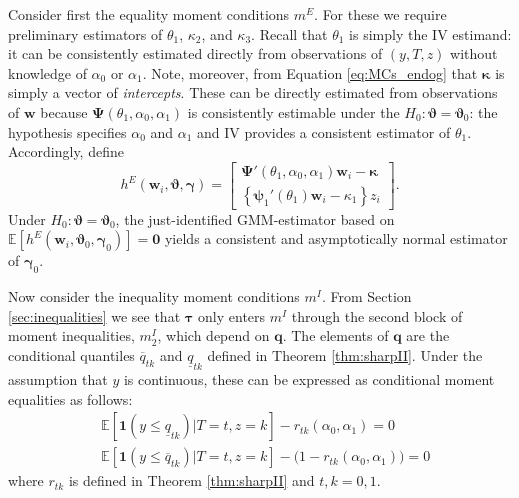 Consider first the equality moment conditions $m^E$.
For these we require preliminary estimators of $\theta_1$, $\kappa_2$, and $\kappa_3$.
Recall that $\theta_1$ is simply the IV estimand: it can be consistently estimated directly from observations of $(y,T,z)$ without knowledge of $\alpha_0$ or $\alpha_1$.
Note, moreover, from Equation \ref{eq:MCs_endog} that $\boldsymbol{\kappa}$ is simply a vector of \emph{intercepts}.
These can be directly estimated from observations of $\mathbf{w}$ because $\boldsymbol{\Psi}(\theta_1, \alpha_0, \alpha_1)$ is consistently estimable under the $H_0\colon \boldsymbol{\vartheta} = \boldsymbol{\vartheta}_0$: the hypothesis specifies $\alpha_0$ and $\alpha_1$ and IV provides a consistent estimator of $\theta_1$.
Accordingly, define 
\begin{equation}
  h^E(\mathbf{w}_i, \boldsymbol{\vartheta}, \boldsymbol{\gamma})  =  \left[
 \begin{array}{l}
   \boldsymbol{\Psi}'(\theta_1, \alpha_0, \alpha_1) \mathbf{w}_i - \boldsymbol{\kappa}\\
   \left\{\boldsymbol{\psi}_1'(\theta_1)\mathbf{w}_i - \kappa_1\right\}z_i
 \end{array}
 \right].
\end{equation}
Under $H_0\colon \boldsymbol{\vartheta} = \boldsymbol{\vartheta}_0$, the  just-identified GMM-estimator based on $\mathbb{E}[h^E(\mathbf{w}_i, \boldsymbol{\vartheta}_0, \boldsymbol{\gamma}_0)] = \mathbf{0}$ yields a consistent and asymptotically normal estimator of $\boldsymbol{\gamma}_0$.

Now consider the inequality moment conditions $m^I$. 
From Section \ref{sec:inequalities} we see that $\boldsymbol{\tau}$ only enters $m^I$ through the second block of moment inequalities, $m_2^I$, which depend on $\mathbf{q}$.
The elements of $\mathbf{q}$ are the conditional quantiles $\overline{q}_{tk}$ and $\underline{q}_{tk}$ defined in Theorem \ref{thm:sharpII}.
Under the assumption that $y$ is continuous, these can be expressed as conditional moment equalities as follows:
\begin{align*}
  &\mathbb{E}\left[ \mathbf{1}(y \leq \underline{q}_{tk}) |T=t,z=k \right] - r_{tk}(\alpha_0, \alpha_1) = 0 \\
  &\mathbb{E}\left[ \mathbf{1}(y \leq \overline{q}_{tk}) |T=t,z=k \right] - \big(1 - r_{tk}(\alpha_0, \alpha_1)\big) = 0
\end{align*}
where $r_{tk}$ is defined in Theorem \ref{thm:sharpII} and $t,k = 0,1$.



